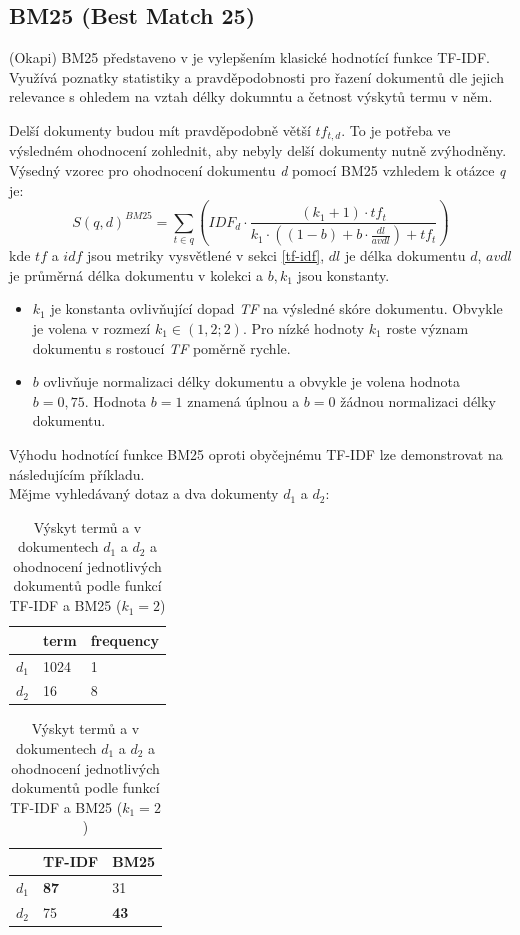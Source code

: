 \subsection{BM25 (Best Match 25)}
\label{bm25}
(Okapi) BM25 představeno v \cite{bm25} je vylepšením klasické hodnotící funkce TF-IDF. Využívá poznatky statistiky a pravděpodobnosti pro řazení dokumentů dle jejich relevance s ohledem na vztah délky dokumntu a četnost výskytů termu v něm.\par
Delší dokumenty budou mít pravděpodobně větší $tf_{t,d}$. To je potřeba ve výsledném ohodnocení zohlednit, aby nebyly delší dokumenty nutně zvýhodněny.
Výsedný vzorec pro ohodnocení dokumentu \emph{d} pomocí BM25 vzhledem k otázce \emph{q} je:
$$
    S(q,d)^{BM25} = \sum_{t \in q} \left(IDF_d \cdot \frac{(k_1+1)\cdot tf_t}{k_1\cdot ((1-b)+b \cdot \frac{dl}{avdl}) + tf_t}\right)
$$
kde $tf$ a $idf$ jsou metriky vysvětlené v sekci \ref{tf-idf}, $dl$ je délka dokumentu $d$, $avdl$ je průměrná délka dokumentu v kolekci a $b,k_1$ jsou konstanty.
\begin{itemize}
    \item $k_1$ je konstanta ovlivňující dopad \emph{TF} na výsledné skóre dokumentu. Obvykle je volena v rozmezí $k_1\in(1,2 ;2)$. Pro nízké hodnoty $k_1$ roste význam dokumentu s rostoucí \emph{TF} poměrně rychle.
    \item $b$ ovlivňuje normalizaci délky dokumentu a obvykle je volena hodnota $b=0,75$. Hodnota $b=1$ znamená úplnou a $b=0$ žádnou normalizaci délky dokumentu.
\end{itemize}

Výhodu hodnotící funkce BM25 oproti obyčejnému TF-IDF lze demonstrovat na následujícím příkladu.\\ \medskip
Mějme vyhledávaný dotaz  a dva dokumenty $d_1$ a $d_2$:\par

\begin{table}[H]
\centering
\begin{tabular}{|c|l|l|}
\hline
      & term & frequency \\ \hline
$d_1$ & 1024 & 1         \\ \hline
$d_2$ & 16   & 8         \\ \hline
\end{tabular}
\begin{tabular}{|c|l|l|}
\hline
      & \textbf{TF-IDF} & \textbf{BM25} \\ \hline
$d_1$ & \textbf{87} & 31         \\ \hline
$d_2$ & 75 & \textbf{43}         \\ \hline
\end{tabular}
\caption{Výskyt termů  a  v dokumentech $d_1$ a $d_2$ a ohodnocení jednotlivých dokumentů podle funkcí TF-IDF a BM25 ($k_1 = 2$)}
\label{tab:tf}
\end{table}

